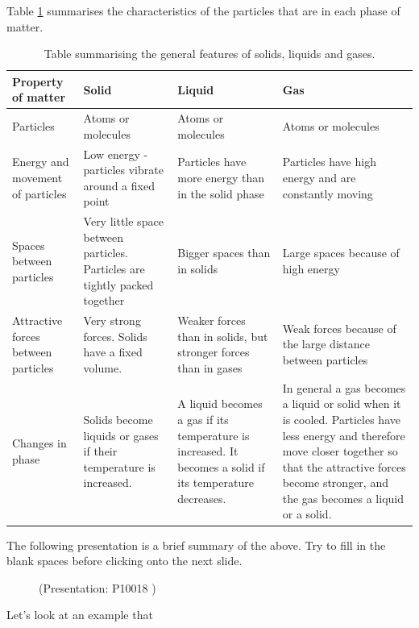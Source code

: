       \label{m38730*id308767}Table \ref{tab:microscopic:kinetic theory} summarises the 
characteristics of the particles that are in each phase of matter.\par 
\begin{table}[h]
\begin{center}
\caption{Table summarising the general features of solids, liquids and gases.}
\label{tab:microscopic:kinetic theory}
\begin{tabular}{|p{3cm}|p{3cm}|p{3cm}|p{3cm}|}\hline
\textbf{Property of matter} & \textbf{Solid} & \textbf{Liquid} & \textbf{Gas} \\\hline
Particles & Atoms or molecules & Atoms or molecules & Atoms or molecules \\\hline
Energy and movement of particles & Low energy - particles vibrate around a fixed point & Particles have more energy than in the solid phase & Particles have high energy and are constantly moving  \\\hline
Spaces between particles & Very little space between particles. Particles are tightly packed together & Bigger spaces than in solids & Large spaces because of high energy  \\\hline
Attractive forces between particles & Very strong forces. Solids have a fixed volume. & Weaker forces than in solids, but stronger forces than in gases & Weak forces because of the large distance between particles  \\\hline
Changes in phase & Solids become liquids or gases if their temperature is increased. & A liquid becomes a gas if its temperature is increased. It becomes a solid if its temperature decreases. & In general a gas becomes a liquid or solid when it is cooled. Particles have less energy and therefore move closer together so that the attractive forces become stronger, and the gas becomes a liquid or a solid.  \\\hline
\end{tabular}
\end{center}
\end{table}
    \par
      \label{m38730*eip-933}The following presentation is a brief summary of the above. Try to fill in the blank spaces before clicking onto the next slide.
    \setcounter{subfigure}{0}
	\begin{figure}[H] %
    \label{m38730*slidesharemedia}\label{m38730*slideshareflash} { (Presentation:  P10018 )}
      \vspace{2pt}
    \vspace{.1in}
 \end{figure}       \par \label{m38730*id309036}Let's look at an example that 
